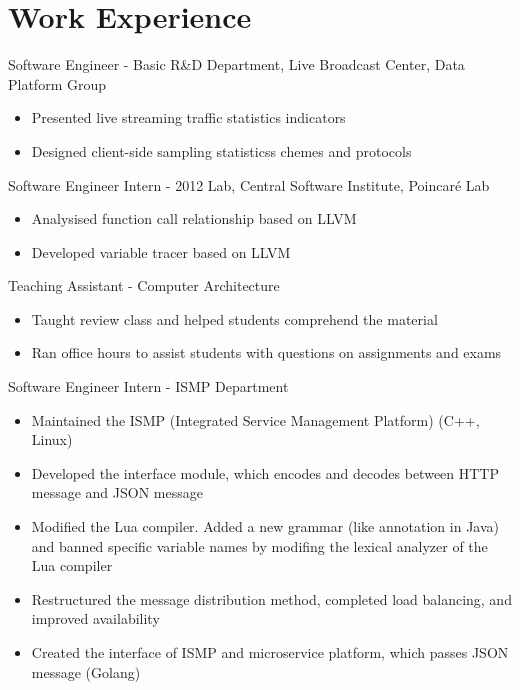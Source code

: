 \documentclass{resume}
\begin{document}
\section{Work Experience}
Software Engineer - Basic R\&D Department, Live Broadcast Center, Data Platform Group
\begin{itemize}[parsep=0.25ex]
    \item Presented live streaming traffic statistics indicators 
    \item Designed client-side sampling statisticss chemes and protocols
\end{itemize}
Software Engineer Intern - 2012 Lab, Central Software Institute, Poincaré Lab
\begin{itemize}[parsep=0.25ex]
    \item Analysised function call relationship  based on LLVM
    \item Developed variable tracer based on LLVM
\end{itemize}
Teaching Assistant - Computer Architecture
\begin{itemize}[parsep=0.25ex]
    \item Taught review class and helped students comprehend the material
    \item Ran office hours to assist students with questions on assignments and exams
\end{itemize}
Software Engineer Intern - ISMP Department
\begin{itemize}[parsep=0.25ex]
    \item Maintained the ISMP (Integrated Service Management Platform) (C++, Linux)
    \item Developed the interface module, which encodes and decodes between HTTP message and JSON message
    \item Modified the Lua compiler. Added a new grammar (like annotation in Java) and banned specific variable names by modifing the lexical analyzer of the Lua compiler
    \item Restructured the message distribution method, completed load balancing, and improved availability
    \item Created the interface of ISMP and microservice platform, which passes JSON message (Golang)
\end{itemize}
\end{document}
